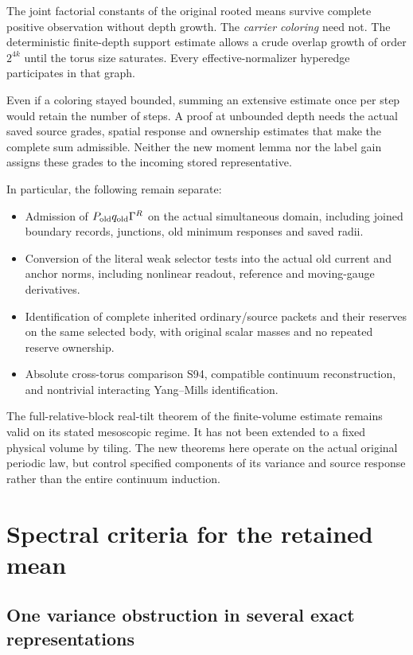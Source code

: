 \documentclass[11pt]{article}
\theoremstyle{definition}\newtheorem{definition}[theorem]{Definition}
\theoremstyle{remark}\newtheorem{remark}[theorem]{Remark}
\begin{document}
The joint factorial constants of the original rooted means survive complete positive observation without depth growth. The \emph{carrier coloring} need not. The deterministic finite-depth support estimate allows a crude overlap growth of order $2^{4k}$ until the torus size saturates. Every effective-normalizer hyperedge participates in that graph.

Even if a coloring stayed bounded, summing an extensive estimate once per step would retain the number of steps. A proof at unbounded depth needs the actual saved source grades, spatial response and ownership estimates that make the complete sum admissible. Neither the new moment lemma nor the label gain assigns these grades to the incoming stored representative.

In particular, the following remain separate:
\begin{itemize}
 \item Admission of $P_{\rm old}q_{\rm old}\Gamma^R$ on the actual simultaneous domain, including joined boundary records, junctions, old minimum responses and saved radii.
 \item Conversion of the literal weak selector tests into the actual old current and anchor norms, including nonlinear readout, reference and moving-gauge derivatives.
 \item Identification of complete inherited ordinary/source packets and their reserves on the same selected body, with original scalar masses and no repeated reserve ownership.
 \item Absolute cross-torus comparison S94, compatible continuum reconstruction, and nontrivial interacting Yang--Mills identification.
\end{itemize}
The full-relative-block real-tilt theorem of the finite-volume estimate remains valid on its stated mesoscopic regime. It has not been extended to a fixed physical volume by tiling. The new theorems here operate on the actual original periodic law, but control specified components of its variance and source response rather than the entire continuum induction.


\section{Spectral criteria for the retained mean}
\label{sb:status}

\subsection{One variance obstruction in several exact representations}
\end{document}
